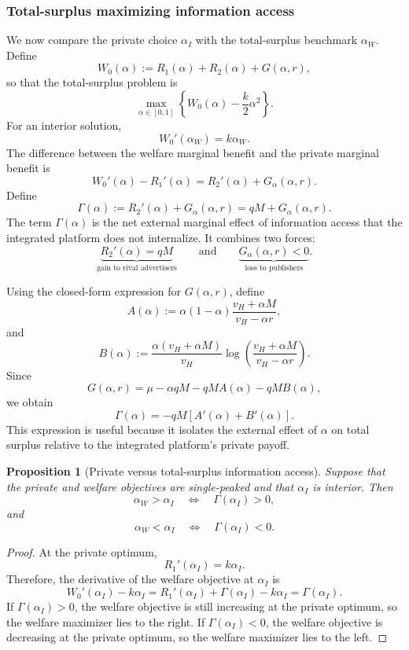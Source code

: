 \documentclass[11pt]{article}
\theoremstyle{plain}
\theoremstyle{definition}
\theoremstyle{plain}
\theoremstyle{plain}
\theoremstyle{plain}
\theoremstyle{plain}
\newtheorem{prop}[thm]{Proposition}
\numberwithin{equation}{section}
\begin{document}
\subsubsection{Total-surplus maximizing information access}

We now compare the private choice $\alpha_I$ with the total-surplus benchmark $\alpha_W$.
Define
\[
W_0(\alpha):=R_1(\alpha)+R_2(\alpha)+G(\alpha,r),
\]
so that the total-surplus problem is
\[
\max_{\alpha\in[0,1]}
\left\{
W_0(\alpha)-\frac{k}{2}\alpha^2
\right\}.
\]
For an interior solution,
\[
W_0'(\alpha_W)=k\alpha_W.
\]
The difference between the welfare marginal benefit and the private marginal benefit is
\[
W_0'(\alpha)-R_1'(\alpha)
=
R_2'(\alpha)+G_\alpha(\alpha,r).
\]
Define
\[
\Gamma(\alpha):=R_2'(\alpha)+G_\alpha(\alpha,r)
=
qM+G_\alpha(\alpha,r).
\]
The term $\Gamma(\alpha)$ is the net external marginal effect of information access that the
integrated platform does not internalize. It combines two forces:
\[
\underbrace{R_2'(\alpha)=qM}_{\text{gain to rival advertisers}}
\qquad\text{and}\qquad
\underbrace{G_\alpha(\alpha,r)<0}_{\text{loss to publishers}}.
\]

Using the closed-form expression for $G(\alpha,r)$, define
\[
A(\alpha)
:=
\alpha(1-\alpha)
\frac{v_H+\alpha M}{v_H-\alpha r},
\]
and
\[
B(\alpha)
:=
\frac{\alpha(v_H+\alpha M)}{v_H}
\log\left(
\frac{v_H+\alpha M}{v_H-\alpha r}
\right).
\]
Since
\[
G(\alpha,r)=\mu-\alpha qM-qM A(\alpha)-qM B(\alpha),
\]
we obtain
\[
\Gamma(\alpha)
=
-qM\left[A'(\alpha)+B'(\alpha)\right].
\]
This expression is useful because it isolates the external effect of $\alpha$ on total surplus
relative to the integrated platform's private payoff.

\begin{prop}[Private versus total-surplus information access]
Suppose that the private and welfare objectives are single-peaked and that $\alpha_I$ is interior.
Then
\[
\alpha_W>\alpha_I
\quad\Longleftrightarrow\quad
\Gamma(\alpha_I)>0,
\]
and
\[
\alpha_W<\alpha_I
\quad\Longleftrightarrow\quad
\Gamma(\alpha_I)<0.
\]
\end{prop}

\begin{proof}
At the private optimum,
\[
R_1'(\alpha_I)=k\alpha_I.
\]
Therefore, the derivative of the welfare objective at $\alpha_I$ is
\[
W_0'(\alpha_I)-k\alpha_I
=
R_1'(\alpha_I)+\Gamma(\alpha_I)-k\alpha_I
=
\Gamma(\alpha_I).
\]
If $\Gamma(\alpha_I)>0$, the welfare objective is still increasing at the private optimum, so
the welfare maximizer lies to the right. If $\Gamma(\alpha_I)<0$, the welfare objective is
decreasing at the private optimum, so the welfare maximizer lies to the left.
\end{proof}
\end{document}
